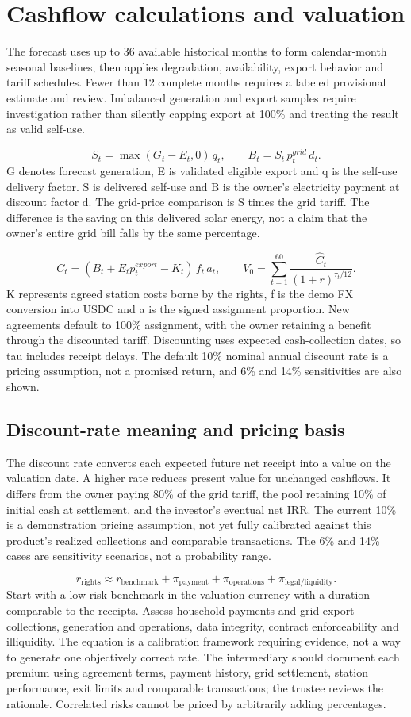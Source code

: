 \documentclass[12pt,a4paper]{article}
\begin{document}
\clearpage\section{Cashflow calculations and valuation}
The forecast uses up to 36 available historical months to form calendar-month seasonal baselines, then applies degradation, availability, export behavior and tariff schedules. Fewer than 12 complete months requires a labeled provisional estimate and review. Imbalanced generation and export samples require investigation rather than silently capping export at 100\% and treating the result as valid self-use.

\[S_t=\max(G_t-E_t,0)\,q_t,\qquad B_t=S_t\,p^{grid}_t\,d_t.\]
G denotes forecast generation, E is validated eligible export and q is the self-use delivery factor. S is delivered self-use and B is the owner’s electricity payment at discount factor d. The grid-price comparison is S times the grid tariff. The difference is the saving on this delivered solar energy, not a claim that the owner’s entire grid bill falls by the same percentage.

\[C_t=(B_t+E_t p^{export}_t-K_t)\,f_t\,a_t,\qquad V_0=\sum_{t=1}^{60}\frac{\widehat C_t}{(1+r)^{\tau_t/12}}.\]
K represents agreed station costs borne by the rights, f is the demo FX conversion into USDC and a is the signed assignment proportion. New agreements default to 100\% assignment, with the owner retaining a benefit through the discounted tariff. Discounting uses expected cash-collection dates, so tau includes receipt delays. The default 10\% nominal annual discount rate is a pricing assumption, not a promised return, and 6\% and 14\% sensitivities are also shown.

\subsection{Discount-rate meaning and pricing basis}
The discount rate converts each expected future net receipt into a value on the valuation date. A higher rate reduces present value for unchanged cashflows. It differs from the owner paying 80\% of the grid tariff, the pool retaining 10\% of initial cash at settlement, and the investor's eventual net IRR. The current 10\% is a demonstration pricing assumption, not yet fully calibrated against this product's realized collections and comparable transactions. The 6\% and 14\% cases are sensitivity scenarios, not a probability range.

\[r_{\mathrm{rights}}\approx r_{\mathrm{benchmark}}+\pi_{\mathrm{payment}}+\pi_{\mathrm{operations}}+\pi_{\mathrm{legal/liquidity}}.\]
Start with a low-risk benchmark in the valuation currency with a duration comparable to the receipts. Assess household payments and grid export collections, generation and operations, data integrity, contract enforceability and illiquidity. The equation is a calibration framework requiring evidence, not a way to generate one objectively correct rate. The intermediary should document each premium using agreement terms, payment history, grid settlement, station performance, exit limits and comparable transactions; the trustee reviews the rationale. Correlated risks cannot be priced by arbitrarily adding percentages.
\end{document}
